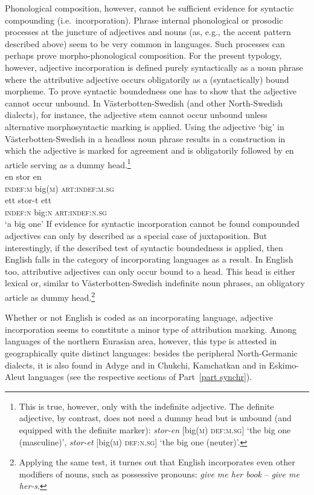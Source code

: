 Phonological composition, however, cannot be sufficient evidence for syntactic compounding (i.e.~incorporation). Phrase internal phonological or prosodic processes at the juncture of adjectives and nouns (as, e.g., the accent pattern described above) seem to be very common in languages. Such processes can perhaps prove morpho-phonological composition. For the present typology, however, adjective incorporation is defined purely syntactically as a noun phrase where the attributive adjective occurs obligatorily as a (syntactically) bound morpheme. To prove syntactic boundedness one has to show that the adjective cannot occur unbound. In Västerbotten-Swedish (and other North-Swedish dialects), for instance, the adjective stem cannot occur unbound unless alternative morphosyntactic marking is applied. Using the adjective ‘big’ in Västerbotten-Swedish in a headless noun phrase results in a construction in which the adjective is marked for agreement and is obligatorily followed by en article serving as a dummy head.\footnote{This is true, however, only with the indefinite adjective. The definite adjective, by contrast, does not need a dummy head but is unbound (and equipped with the definite marker): {\it	stor-en} [big(\textsc{m}) \textsc{def:m.sg}] ‘the big one (masculine)’, \textit{stor-et} [big(\textsc{m}) \textsc{def:n.sg}] ‘the big one (neuter)’.}
\ea \label{bondska headless}
\\
\ea
\gll 	en stor en\\	
	\textsc{indef:m} big(\textsc{m}) \textsc{art:indef:m.sg}\\
\ex
\gll 	ett stor-t ett\\	
	\textsc{indef:n} big:\textsc{n} \textsc{art:indef:n.sg}\\
\glt	‘a big one’
\z
\z
If evidence for syntactic incorporation cannot be found compounded adjectives can only by described as a special case of juxtaposition. But interestingly, if the described test of syntactic boundedness is applied, then English falls in the category of incorporating languages as a result. In English too, attributive adjectives can only occur bound to a head. This head is either lexical or, similar to Västerbotten-Swedish indefinite noun phrases, an obligatory article as dummy head.\footnote{Applying the same test, it turnes out that English incorporates even other modifiers of nouns, such as possessive pronouns: \textit{give me her book} – \textit{give me her-s}.}

Whether or not English is coded as an incorporating language, adjective incorporation seems to constitute a minor type of attribution marking. Among languages of the northern Eurasian area, however, this type is attested in geographically quite distinct languages: besides the peripheral North-Germanic dialects, it is also found in Adyge and in Chukchi, Kamchatkan and in Eskimo-Aleut languages (see the respective sections of Part~\ref{part synchr}).


